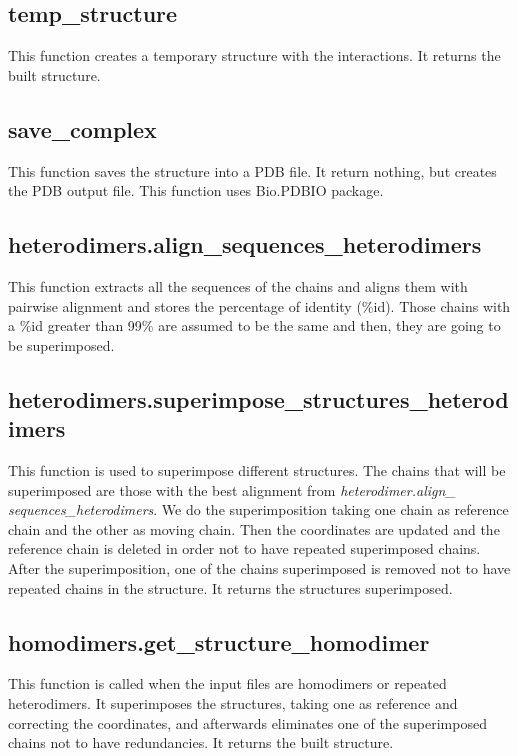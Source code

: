 \documentclass[a4paper,12pt]{report}
\begin{document}
\subsection{temp\_structure}

This function creates a temporary structure with the interactions. It returns the built structure.

\subsection{save\_complex}

This function saves the structure into a PDB file. It return nothing, but creates the PDB output file. This function uses Bio.PDBIO package.

\subsection{heterodimers.align\_sequences\_heterodimers}

This function extracts all the sequences of the chains and aligns them with pairwise alignment and stores the percentage of identity (\%id). Those chains with a \%id greater than 99\% are assumed to be the same and then, they are going to be superimposed. 

\subsection{heterodimers.superimpose\_structures\_heterodimers}

This function is used to superimpose different structures. The chains that will be superimposed are those with the best alignment from \textit{heterodimer.align\_\\sequences\_heterodimers}. 
We do the superimposition taking one chain as reference chain and the other as moving chain. Then the coordinates are updated and the reference chain is deleted in order not to have repeated superimposed chains. 
After the superimposition, one of the chains superimposed is removed not to have repeated chains in the structure. It returns the structures superimposed.

\subsection{homodimers.get\_structure\_homodimer}

This function is called when the input files are homodimers or repeated heterodimers. It superimposes the structures, taking one as reference and correcting the coordinates, and afterwards eliminates one of the superimposed chains not to have redundancies. It returns the built structure.
\end{document}
